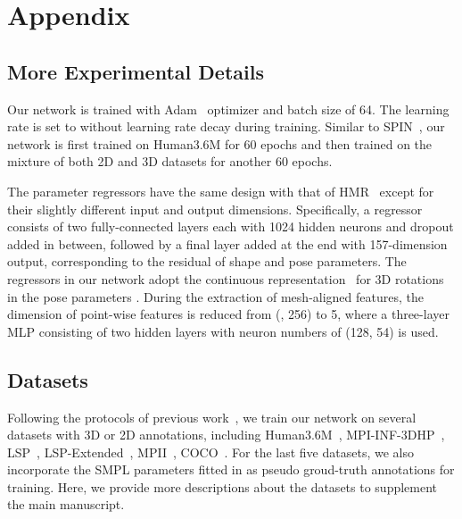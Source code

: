 \documentclass[10pt,twocolumn,letterpaper]{article}
\begin{document}
\appendix


\section{Appendix}

\subsection{More Experimental Details}
\label{sec:implementation}
Our network is trained with Adam~\cite{kingma2014adam} optimizer and batch size of 64.
The learning rate is set to  without learning rate decay during training.
Similar to SPIN~\cite{kolotouros2019learning}, our network is first trained on Human3.6M for 60 epochs and then trained on the mixture of both 2D and 3D datasets for another 60 epochs.


The parameter regressors have the same design with that of HMR~\cite{kanazawa2018end} except for their slightly different input and output dimensions.
Specifically, a regressor consists of two fully-connected layers each with 1024 hidden neurons and dropout added in between, followed by a final layer added at the end with 157-dimension output, corresponding to the residual of shape and pose parameters.
The regressors in our network adopt the continuous representation~\cite{zhou2019continuity} for 3D rotations in the pose parameters .
During the extraction of mesh-aligned features, the dimension of point-wise features is reduced from  (\ie, 256) to 5, where a three-layer MLP consisting of two hidden layers with neuron numbers of (128, 54) is used.



\subsection{Datasets}
\label{sec:datasets}
Following the protocols of previous work~\cite{kanazawa2018end,kolotouros2019learning}, we train our network on several datasets with 3D or 2D annotations, including Human3.6M~\cite{ionescu2014human3}, MPI-INF-3DHP~\cite{mehta2017monocular}, LSP~\cite{johnson2010clustered}, LSP-Extended~\cite{johnson2011learning}, MPII~\cite{andriluka20142d}, COCO~\cite{lin2014microsoft}.
For the last five datasets, we also incorporate the SMPL parameters fitted in \cite{bogo2016keep,kolotouros2019learning} as pseudo groud-truth annotations for training.
Here, we provide more descriptions about the datasets to supplement the main manuscript.
\end{document}
